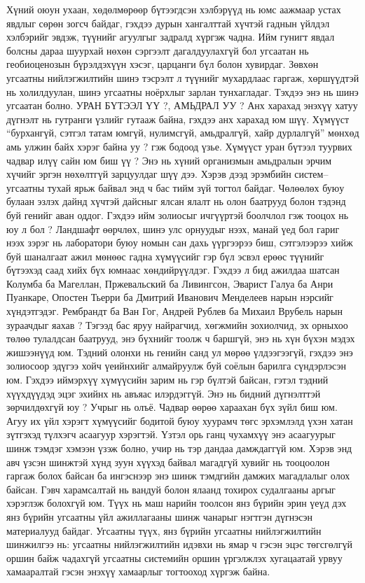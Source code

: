 Хүний оюун ухаан, хөдөлмөрөөр бүтээгдсэн хэлбэрүүд нь юмс аажмаар устах явдлыг сөрөн зогсч байдаг, гэхдээ дурын хангалттай хүчтэй гаднын үйлдэл хэлбэрийг эвдэж, түүнийг агуулгыг задралд хүргэж чадна. Ийм гунигт явдал болсны дараа шуурхай нөхөн сэргээлт дагалдуулахгүй бол угсаатан нь геобиоценозын бүрэлдэхүүн хэсэг, царцанги бүл болон хувирдаг. Зөвхөн угсаатны нийлэгжилтийн шинэ тэсрэлт л түүнийг мухардлаас гаргаж, хөршүүдтэй нь холилдуулан, шинэ угсаатны ноёрхлыг зарлан тунхагладаг. Тэхдээ энэ нь шинэ угсаатан болно.
УРАН БҮТЭЭЛ ҮҮ ?, АМЬДРАЛ УУ ?
Анх харахад энэхүү хатуу дүгнэлт нь гутранги үзлийг гутааж байна, гэхдээ анх харахад юм шүү. Хүмүүст “бурхангүй, сэтгэл татам юмгүй, нулимсгүй, амьдралгүй, хайр дурлалгүй” мөнхөд амь улжин байх хэрэг байна уу ? гэж бодоод үзье.
Хүмүүст уран бүтээл туурвих чадвар илүү сайн юм биш үү ? Энэ нь хүний организмын амьдралын эрчим хүчийг эргэн нөхөлтгүй зарцуулдаг шүү дээ. Хэрэв дээд эрэмбийн систем–угсаатны тухай ярьж байвал энд ч бас тийм зүй тогтол байдаг. Чөлөөлөх буюу булаан эзлэх дайнд хүчтэй дайсныг ялсан ялалт нь олон баатрууд болон тэдэнд буй генийг аван оддог. Гэхдээ ийм золиосыг ичгүүртэй боолчлол гэж тооцох нь юу л бол ? Ландшафт өөрчлөх, шинэ улс орнуудыг нээх, манай үед бол гариг нээх зэрэг нь лаборатори буюу номын сан дахь үүргээрээ биш, сэтгэлээрээ хийж буй шаналгаат ажил мөнөөс гадна хүмүүсийг гэр бүл эсвэл ерөөс түүнийг бүтээхэд саад хийх бүх юмнаас хөндийрүүлдэг. Гэхдээ л бид ажилдаа шатсан Колумба ба Магеллан, Пржевальский ба Ливингсон, Эварист Галуа ба Анри Пуанкаре, Опостен Тьерри ба Дмитрий Иванович Менделеев нарын нэрсийг хүндэтгэдэг. Рембрандт ба Ван Гог, Андрей Рублев ба Михаил Врубель нарын зураачдыг яахав ? Тэгээд бас яруу найрагчид, хөгжмийн зохиолчид, эх орныхоо төлөө тулалдсан баатрууд, энэ бүхнийг тоолж ч баршгүй, энэ нь хүн бүхэн мэдэх жишээнүүд юм. Тэдний олонхи нь генийн санд ул мөрөө үлдээгээгүй, гэхдээ энэ золиосоор эдүгээ хойч үеийнхийг алмайруулж буй соёлын барилга сүндэрлэсэн юм.
Гэхдээ иймэрхүү хүмүүсийн зарим нь гэр бүлтэй байсан, гэтэл тэдний хүүхдүүдэд эцэг эхийнх нь авъяас илэрдэггүй. Энэ нь бидний дүгнэлттэй зөрчилдөхгүй юу ? Учрыг нь олъё.
Чадвар өөрөө хараахан бүх зүйл биш юм. Агуу их үйл хэрэгт хүмүүсийг бодитой буюу хуурамч төгс эрхэмлэлд үхэн хатан зүтгэхэд түлхэгч асаагуур хэрэгтэй. Үзтэл орь ганц чухамхүү энэ асаагуурыг шинж тэмдэг хэмээн үзэж болно, учир нь тэр дандаа дамждаггүй юм. Хэрэв энд авч үзсэн шинжтэй хүнд зуун хүүхэд байвал магадгүй хувийг нь тооцоолон гаргаж болох байсан ба ингэснээр энэ шинж тэмдгийн дамжих магадлалыг олох байсан. Гэвч харамсалтай нь вандуй болон ялаанд тохирох судалгааны аргыг хэрэглэж болохгүй юм. Түүх нь маш нарийн тоолсон янз бүрийн эрин үеүд дэх янз бүрийн угсаатны үйл ажиллагааны шинж чанарыг нэгтгэн дүгнэсэн материалууд байдаг. Угсаатны түүх, янз бүрийн угсаатны нийлэгжилтийн шинжилгээ нь: угсаатны нийлэгжилтийн идэвхи нь ямар ч гэсэн эцэс төгсгөлгүй оршин байж чадахгүй угсаатны системийн оршин үргэлжлэх хугацаатай урвуу хамааралтай гэсэн энэхүү хамаарлыг тогтооход хүргэж байна.
